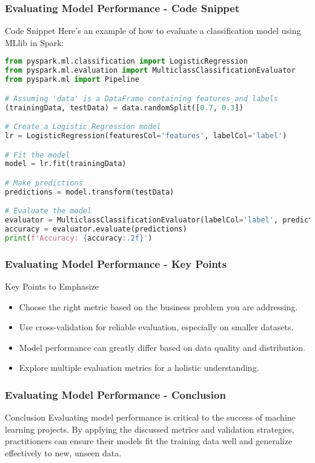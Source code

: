 \documentclass[aspectratio=169]{beamer}
\begin{document}
\begin{frame}[fragile]
    \frametitle{Evaluating Model Performance - Code Snippet}
    \begin{block}{Code Snippet}
        Here’s an example of how to evaluate a classification model using MLlib in Spark:
        \begin{lstlisting}[language=python]
from pyspark.ml.classification import LogisticRegression
from pyspark.ml.evaluation import MulticlassClassificationEvaluator
from pyspark.ml import Pipeline

# Assuming 'data' is a DataFrame containing features and labels
(trainingData, testData) = data.randomSplit([0.7, 0.3])

# Create a Logistic Regression model
lr = LogisticRegression(featuresCol='features', labelCol='label')

# Fit the model
model = lr.fit(trainingData)

# Make predictions
predictions = model.transform(testData)

# Evaluate the model
evaluator = MulticlassClassificationEvaluator(labelCol='label', predictionCol='prediction', metricName='accuracy')
accuracy = evaluator.evaluate(predictions)
print(f'Accuracy: {accuracy:.2f}')
        \end{lstlisting}
    \end{block}
\end{frame}

\begin{frame}
    \frametitle{Evaluating Model Performance - Key Points}
    \begin{block}{Key Points to Emphasize}
        \begin{itemize}
            \item Choose the right metric based on the business problem you are addressing.
            \item Use cross-validation for reliable evaluation, especially on smaller datasets.
            \item Model performance can greatly differ based on data quality and distribution.
            \item Explore multiple evaluation metrics for a holistic understanding.
        \end{itemize}
    \end{block}
\end{frame}

\begin{frame}
    \frametitle{Evaluating Model Performance - Conclusion}
    \begin{block}{Conclusion}
        Evaluating model performance is critical to the success of machine learning projects. 
        By applying the discussed metrics and validation strategies, practitioners can ensure their models fit the training data well and generalize effectively to new, unseen data.
    \end{block}
\end{frame}
\end{document}
